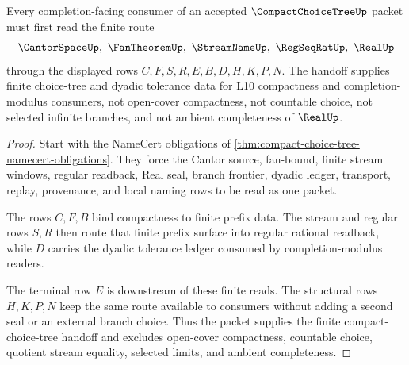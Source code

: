 \begin{theorem}
\label{thm:compact-choice-tree-completion-handoff}
Every completion-facing consumer of an accepted $\CompactChoiceTreeUp$ packet must first read the finite route
$$
\CantorSpaceUp,\ \FanTheoremUp,\ \StreamNameUp,\ \RegSeqRatUp,\ \RealUp
$$
through the displayed rows $C,F,S,R,E,B,D,H,K,P,N$. The handoff supplies finite choice-tree and dyadic tolerance data for L10 compactness and completion-modulus consumers, not open-cover compactness, not countable choice, not selected infinite branches, and not ambient completeness of $\RealUp$.
\end{theorem}
\begin{proof}
Start with the NameCert obligations of \autoref{thm:compact-choice-tree-namecert-obligations}. They force the Cantor source, fan-bound, finite stream windows, regular readback, Real seal, branch frontier, dyadic ledger, transport, replay, provenance, and local naming rows to be read as one packet.

The rows $C,F,B$ bind compactness to finite prefix data. The stream and regular rows $S,R$ then route that finite prefix surface into regular rational readback, while $D$ carries the dyadic tolerance ledger consumed by completion-modulus readers.

The terminal row $E$ is downstream of these finite reads. The structural rows $H,K,P,N$ keep the same route available to consumers without adding a second seal or an external branch choice. Thus the packet supplies the finite compact-choice-tree handoff and excludes open-cover compactness, countable choice, quotient stream equality, selected limits, and ambient completeness.
\end{proof}



